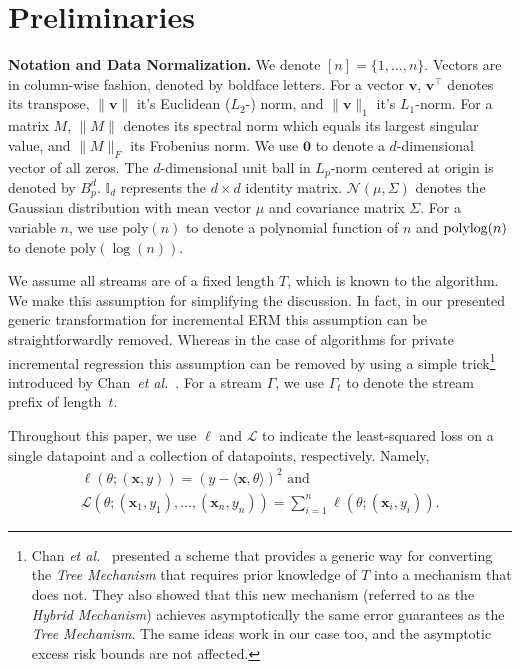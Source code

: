 \documentclass{article}
\theoremstyle{plain}
\def \polylog{\mbox{\rm polylog}}
\def \NNN {\mathcal{N}}
\def \LLL {\mathcal{L}}
\def \poly {\mathrm{poly}}
\def \v {\mathbf v}
\def \x {\mathbf x}
\begin{document}
\section{Preliminaries} \label{sec:prelim}
\noindent\textbf{Notation and Data Normalization.} We denote $[n]=\{1,\ldots,n\}$. Vectors are in column-wise fashion, denoted by boldface letters. For a vector $\v$, $\v^\top$ denotes its transpose, $\|\v\|$ it's Euclidean ($L_2$-) norm, and $\| \v \|_1$ it's $L_1$-norm. For a matrix $M$, $\|M\|$ denotes its spectral norm which equals its largest singular value, and $\| M \|_F$ its Frobenius norm. We use $\mathbf{0}$ to denote a $d$-dimensional vector  of all zeros.  The $d$-dimensional unit ball in $L_p$-norm centered at origin is denoted by $B_p^d$. $\mathbb{I}_d$ represents the $d \times d$ identity matrix. $\NNN(\mu,\Sigma)$ denotes the Gaussian distribution with mean vector $\mu$ and covariance matrix $\Sigma$. For a variable $n$, we use $\poly(n)$ to denote a polynomial function of $n$ and $\polylog(n)$ to denote $\poly(\log(n))$.

We assume all streams are of a fixed length $T$, which is known to the algorithm. We make this assumption for simplifying the discussion. In fact, in our presented generic transformation for incremental ERM this assumption can be straightforwardly removed. Whereas in the case of algorithms for private incremental regression this assumption can be removed by using a simple trick\footnote{Chan \emph{et al.}\ \cite{CSS11} presented a scheme that provides a generic way for converting the \emph{Tree Mechanism} that requires prior knowledge of $T$ into a mechanism that does not.  They also showed that this new mechanism (referred to as the \emph{Hybrid Mechanism}) achieves asymptotically the same error guarantees as the \emph{Tree Mechanism}. The same ideas work in our case too, and the asymptotic excess risk bounds are not affected.} introduced by Chan~\emph{et al.}~\cite{CSS11}. For a stream $\Gamma$, we use $\Gamma_t$ to denote the stream prefix of length~$t$. 

Throughout this paper, we use $\ell$ and $\LLL$ to indicate the least-squared loss on a single datapoint and a collection of datapoints, respectively. Namely,
\begin{eqnarray*}
& \ell(\theta;(\x,y)) = (y - \langle \x,\theta \rangle)^2 \mbox{ and } & \\
& \LLL(\theta;(\x_1,y_1),\dots,(\x_n,y_n)) = \sum_{i=1}^n \ell(\theta;(\x_i,y_i)).&
\end{eqnarray*}
\end{document}

